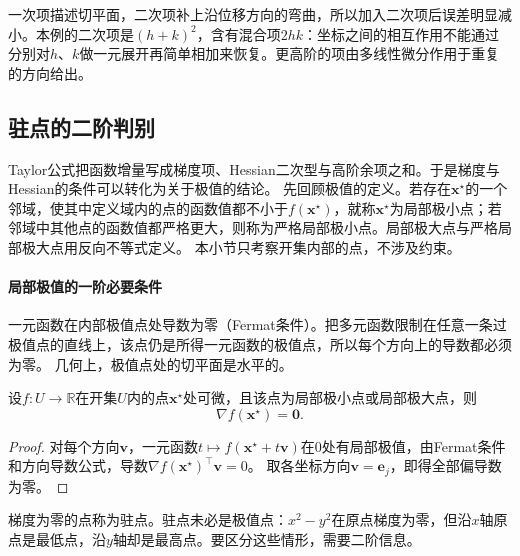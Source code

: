 一次项描述切平面，二次项补上沿位移方向的弯曲，所以加入二次项后误差明显减小。本例的二次项是$(h+k)^2$，含有混合项$2hk$：坐标之间的相互作用不能通过分别对$h$、$k$做一元展开再简单相加来恢复。更高阶的项由多线性微分作用于重复的方向给出。

\subsection{驻点的二阶判别}

Taylor公式把函数增量写成梯度项、Hessian二次型与高阶余项之和。于是梯度与Hessian的条件可以转化为关于极值的结论。
先回顾极值的定义。若存在$\bm x^\star$的一个邻域，使其中定义域内的点的函数值都不小于$f(\bm x^\star)$，就称$\bm x^\star$为局部极小点；若邻域中其他点的函数值都严格更大，则称为严格局部极小点。局部极大点与严格局部极大点用反向不等式定义。
本小节只考察开集内部的点，不涉及约束。

\paragraph{局部极值的一阶必要条件}
一元函数在内部极值点处导数为零（Fermat条件）。把多元函数限制在任意一条过极值点的直线上，该点仍是所得一元函数的极值点，所以每个方向上的导数都必须为零。
几何上，极值点处的切平面是水平的。
\begin{theorem}[局部极值的一阶必要条件]
\label{thm:multivariable-extremum-first-order}
设$f:U\to\mathbb R$在开集$U$内的点$\bm x^\star$处可微，且该点为局部极小点或局部极大点，则
\begin{equation}
 \nabla f(\bm x^\star)=\bm0.
\label{eq:analysis-first-order-necessary}
\end{equation}
\end{theorem}
\begin{proof}
对每个方向$\bm v$，一元函数$t\mapsto f(\bm x^\star+t\bm v)$在$0$处有局部极值，由Fermat条件和方向导数公式，导数$\nabla f(\bm x^\star)^\top\bm v=0$。
取各坐标方向$\bm v=\bm e_j$，即得全部偏导数为零。
\end{proof}
梯度为零的点称为驻点。驻点未必是极值点：$x^2-y^2$在原点梯度为零，但沿$x$轴原点是最低点，沿$y$轴却是最高点。要区分这些情形，需要二阶信息。

